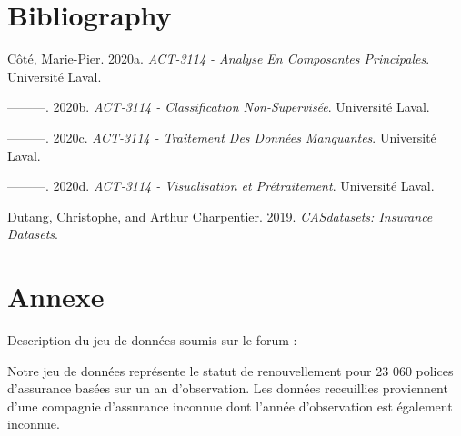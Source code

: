 \documentclass[
]{article}
\begin{document}
\newpage

\hypertarget{bibliography}{%
\section{Bibliography}\label{bibliography}}

\hypertarget{refs}{}
\leavevmode\hypertarget{ref-AnalyseComposantesPrincipales}{}%
Côté, Marie-Pier. 2020a. \emph{ACT-3114 - Analyse En Composantes
Principales}. Université Laval.

\leavevmode\hypertarget{ref-ClassificationNonSupervisuxe9e}{}%
---------. 2020b. \emph{ACT-3114 - Classification Non-Supervisée}.
Université Laval.

\leavevmode\hypertarget{ref-TraitementDonnesManquantes}{}%
---------. 2020c. \emph{ACT-3114 - Traitement Des Données Manquantes}.
Université Laval.

\leavevmode\hypertarget{ref-VisualisationPretraitement}{}%
---------. 2020d. \emph{ACT-3114 - Visualisation et Prétraitement}.
Université Laval.

\leavevmode\hypertarget{ref-CASdatasets}{}%
Dutang, Christophe, and Arthur Charpentier. 2019. \emph{CASdatasets:
Insurance Datasets}.

\newpage

\hypertarget{annexe}{%
\section{Annexe}\label{annexe}}

Description du jeu de données soumis sur le forum :

Notre jeu de données représente le statut de renouvellement pour 23 060
polices d'assurance basées sur un an d'observation. Les données
receuillies proviennent d'une compagnie d'assurance inconnue dont
l'année d'observation est également inconnue.
\end{document}
